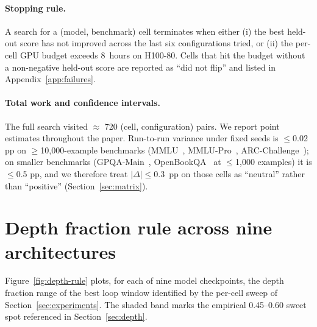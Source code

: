 \paragraph{Stopping rule.} A search for a (model, benchmark) cell terminates when either (i) the best held-out score has not improved across the last six configurations tried, or (ii) the per-cell GPU budget exceeds 8~hours on H100-80. Cells that hit the budget without a non-negative held-out score are reported as ``did not flip'' and listed in Appendix~\ref{app:failures}.

\paragraph{Total work and confidence intervals.} The full search visited $\approx$ 720 (cell, configuration) pairs. We report point estimates throughout the paper. Run-to-run variance under fixed seeds is $\le$0.02 pp on $\ge$10,000-example benchmarks (MMLU~\citep{hendrycks2021mmlu}, MMLU-Pro~\citep{wang2024mmlupro}, ARC-Challenge~\citep{clark2018arc}); on smaller benchmarks (GPQA-Main~\citep{rein2024gpqa}, OpenBookQA~\citep{mihaylov2018obqa} at $\le$1,000 examples) it is $\le$0.5 pp, and we therefore treat $|\Delta| \le 0.3$~pp on those cells as ``neutral'' rather than ``positive'' (Section~\ref{sec:matrix}).

\section{Depth fraction rule across nine architectures}
\label{app:depth-figure}

Figure~\ref{fig:depth-rule} plots, for each of nine model checkpoints, the depth fraction range of the best loop window identified by the per-cell sweep of Section~\ref{sec:experiments}. The shaded band marks the empirical 0.45--0.60 sweet spot referenced in Section~\ref{sec:depth}.




